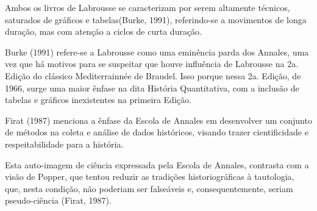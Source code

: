 \documentclass[
12pt,		%
openright,	%
twoside,  %
a4paper,			%
chapter=TITLE,		%
english,			%
french,				%
spanish,			%
brazil				%
]{USPSC-classe/USPSC}
\begin{document}
Ambos os livros de Labrousse se caracterizam por serem altamente t\'ecnicos, \textquotedbl saturados de gr\'aficos e tabelas\textquotedbl   (Burke, 1991), referindo-se a movimentos de longa dura\c{c}\~ao, mas com aten\c{c}\~ao a ciclos de curta dura\c{c}\~ao.

















Burke (1991) refere-se a Labrousse como uma \textquotedbl emin\^encia parda dos Annales\textquotedbl , uma vez que \textquotedbl h\'a motivos para se suspeitar que houve influ\^encia de Labrousse na 2a. Edi\c{c}\~ao do cl\'assico Mediterrainn\'ee de Braudel\textquotedbl . Isso porque nessa 2a. Edi\c{c}\~ao, de 1966, surge uma maior \^enfase na dita Hist\'oria Quantitativa, com a inclus\~ao de tabelas e gr\'aficos inexistentes na primeira Edi\c{c}\~ao.

















Firat (1987) menciona a \^enfase da Escola de Annales em \textquotedbl desenvolver um conjunto de m\'etodos na coleta e an\'alise de dados hist\'oricos\textquotedbl , visando \textquotedbl trazer cientificidade e respeitabilidade para a hist\'oria\textquotedbl .

















Esta auto-imagem de ci\^encia expressada pela Escola de Annales, contrasta com a vis\~ao de Popper, que tentou reduzir as tradi\c{c}\~oes historiogr\'aficas \`a tautologia, que, nesta condi\c{c}\~ao, n\~ao poderiam ser false\'aveis e, consequentemente, seriam pseudo-ci\^encia  (Firat, 1987).
\end{document}
